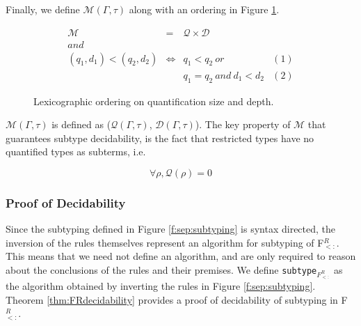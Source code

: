 \documentclass[runningheads, anon]{llncs}
\begin{document}
Finally, we define $\mathcal{M}(\Gamma, \tau)$ along with an ordering in Figure \ref{f:measure}.
\begin{figure}[t]
\begin{minipage}{\linewidth}
\[
\begin{array}{lclr}
\mathcal{M}
			& =
			& \mathcal{Q} \times \mathcal{D} &\\
\textit{and} & & \\
(q_1, d_1) < (q_2, d_2)
			& \iff
			& q_1 < q_2 \ \textit{or} & (1)\\

			&
			&  q_1 = q_2\ \textit{and}\ d_1 < d_2 & (2)
			
\end{array}
\]
\caption{Lexicographic ordering on quantification size and depth.}
\label{f:measure}
\end{minipage}
\end{figure}
$\mathcal{M}(\Gamma, \tau)$ is defined as ($\mathcal{Q}(\Gamma, \tau)$, $\mathcal{D}(\Gamma, \tau)$). 
The key property of $\mathcal{M}$ that guarantees subtype decidability, is the fact that restricted types
have no quantified types as subterms, i.e. 
\begin{property}
\label{prop:Qrestricted}
$$\forall \rho, \mathcal{Q}(\rho) = 0$$
\end{property}

\subsubsection{Proof of Decidability}

Since the subtyping defined in Figure \ref{f:sep:subtyping} is syntax directed, the inversion of the rules themselves represent an algorithm for 
subtyping of F$_{<:}^R$. This means that we need not define an algorithm, and are only required to reason about the conclusions of the rules and their premises.
We define \texttt{subtype}$_{F_{<:}^R}$ as the algorithm obtained by inverting the rules in Figure \ref{f:sep:subtyping}.
Theorem \ref{thm:FRdecidability} provides a proof of decidability of subtyping in F$_{<:}^R$.
\end{document}
